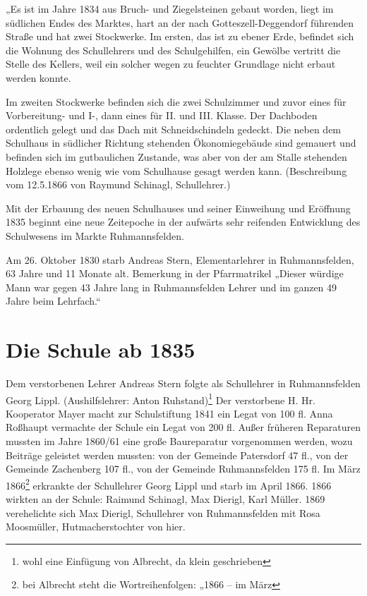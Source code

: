 \documentclass[12pt,a4paper]{book}
\begin{document}
„Es ist im Jahre 1834 aus Bruch- und Ziegelsteinen gebaut worden, liegt
im südlichen Endes des Marktes, hart an der nach Gotteszell-Deggendorf
führenden Straße und hat zwei Stockwerke. Im ersten, das ist zu ebener
Erde, befindet sich die Wohnung des Schullehrers und des Schulgehilfen,
ein Gewölbe vertritt die Stelle des Kellers, weil ein solcher wegen zu
feuchter Grundlage nicht erbaut werden konnte.

Im zweiten Stockwerke befinden sich die zwei Schulzimmer und zuvor eines
für Vorbereitung- und I-, dann eines für II. und III. Klasse. Der
Dachboden ordentlich gelegt und das Dach mit Schneidschindeln gedeckt.
Die neben dem Schulhaus in südlicher Richtung stehenden Ökonomiegebäude
sind gemauert und befinden sich im gutbaulichen Zustande, was aber von
der am Stalle stehenden Holzlege ebenso wenig wie vom Schulhause gesagt
werden kann. (Beschreibung vom 12.5.1866 von Raymund Schinagl,
Schullehrer.)

Mit der Erbauung des neuen Schulhauses und seiner Einweihung und
Eröffnung 1835 beginnt eine neue Zeitepoche in der aufwärts sehr
reifenden Entwicklung des Schulwesens im Markte Ruhmannsfelden.

Am 26. Oktober 1830 starb Andreas Stern, Elementarlehrer in
Ruhmannsfelden, 63 Jahre und 11 Monate alt. Bemerkung in der
Pfarrmatrikel „Dieser würdige Mann war gegen 43 Jahre lang in
Ruhmannsfelden Lehrer und im ganzen 49 Jahre beim Lehrfach.“

\section[Die Schule ab 1835]{Die Schule ab
1835\protect\footnotemark{}\protect{}}

Dem verstorbenen Lehrer Andreas Stern folgte als Schullehrer in
Ruhmannsfelden Georg Lippl. (Aushilfslehrer: Anton
Ruhstand)\footnote{wohl eine Einfügung von Albrecht, da klein
geschrieben} Der verstorbene H. Hr. Kooperator Mayer macht zur
Schulstiftung 1841 ein Legat von 100 fl. Anna Roßhaupt vermachte der
Schule ein Legat von 200 fl. Außer früheren Reparaturen mussten im Jahre
1860/61 eine große Baureparatur vorgenommen werden, wozu Beiträge
geleistet werden mussten: von der Gemeinde Patersdorf 47 fl., von der
Gemeinde Zachenberg 107 fl., von der Gemeinde Ruhmannsfelden 175 fl. Im
März 1866\footnote{bei Albrecht steht die Wortreihenfolgen: „1866 – im
März} erkrankte der Schullehrer Georg Lippl und starb im April 1866.
1866 wirkten an der Schule: Raimund Schinagl, Max Dierigl, Karl Müller.
1869 verehelichte sich Max Dierigl, Schullehrer von Ruhmannsfelden mit
Rosa Moosmüller, Hutmacherstochter von hier.
\end{document}
